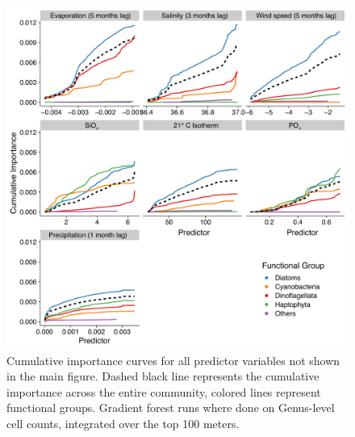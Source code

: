 \documentclass[draft]{agujournal2019}
\begin{document}
\begin{figure}
\noindent\includegraphics[width=\textwidth]{fig/FigureA2_GF_output_Supplement_v1.pdf}
\caption{Cumulative importance curves for all predictor variables not shown in the main figure. Dashed black line represents the cumulative importance across the entire community, colored lines represent functional groups. Gradient forest runs where done on Genus-level cell counts, integrated over the top 100 meters.}
\label{fig:sup:GFoutput_lags_extra}
\end{figure}
\end{document}
